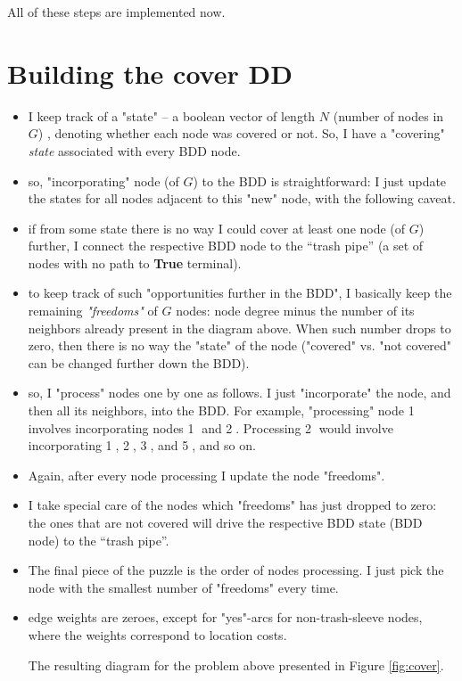 \documentclass[11pt]{article}
\begin{document}
All of these steps are implemented now.

\section{Building the cover DD}
\label{sec:orga273f85}
\begin{itemize}
\item I keep track of a "state" -- a boolean vector of length \(N\) (number of nodes
in \(G\)) , denoting whether each node was covered or not. So, I have a
"covering" \emph{state} associated with every BDD node.
\item so, "incorporating" node (of \(G\)) to the BDD is straightforward: I just update
the states for all nodes adjacent to this "new" node, with the following caveat.
\item if from some state there is no way I could cover at least one node (of \(G\))
further, I connect the respective BDD node to the ``trash pipe'' (a set of
nodes with no path to \textbf{True} terminal).
\item to keep track of such "opportunities further in the BDD", I basically keep the
remaining \emph{"freedoms"} of \(G\) nodes: node degree minus the number of its
neighbors already present in the diagram above. When such number drops to
zero, then there is no way the "state" of the node ("covered" vs. "not
covered" can be changed further down the BDD).
\item so, I "process" nodes one by one as follows. I just "incorporate" the node,
and then all its neighbors, into the BDD. For example, "processing" node
\textcircled{1} involves incorporating nodes \textcircled{1} and
\textcircled{2}. Processing \textcircled{2} would involve incorporating
\textcircled{1}, \textcircled{2}, \textcircled{3}, and \textcircled{5}, and so
on.
\item Again, after every node processing I update the node "freedoms".
\item I take special care of the nodes which "freedoms" has just dropped to zero: the ones
that are not covered will drive the respective BDD state (BDD node) to the
``trash pipe''.
\item The final piece of the puzzle is the order of nodes processing. I just pick
the node with the smallest number of "freedoms" every time.
\item edge weights are zeroes, except for "yes"-arcs for non-trash-sleeve nodes,
where the weights correspond to location costs.

The resulting diagram for the problem above presented in Figure \ref{fig:cover}.
\end{itemize}
\end{document}
